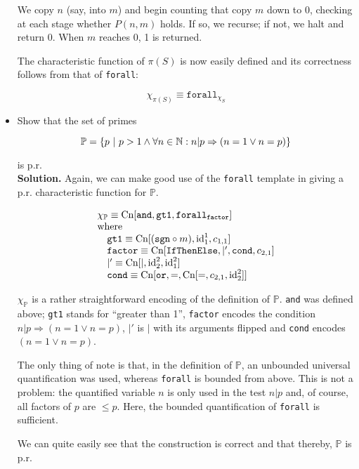 \begin{itemize}
	We copy $n$ (say, into $m$) and begin counting that copy $m$ down to 0, checking at each stage whether $P(n,m)$ holds. If so, we recurse; if not, we halt and return 0. When $m$ reaches 0, 1 is returned.
	
	The characteristic function of $\pi(S)$ is now easily defined and its correctness follows from that of \texttt{forall}:
	
	$$
		\chi_{\pi(S)} \equiv \texttt{forall}_{\chi_S}
	$$
	
	\item Show that the set of primes
	
	$$
		\mathbb{P} = \{p\ |\ p > 1 \wedge \forall n \in \mathbb{N} : n | p \Rightarrow (n = 1 \vee n = p) \}
	$$
	
	is p.r.\\
	
	\textbf{Solution.} Again, we can make good use of the \texttt{forall} template in giving a p.r. characteristic function for $\mathbb{P}$.
	
	$$
		\begin{array}{l}
			\chi_{\mathbb{P}} \equiv \textnormal{Cn}[\texttt{and}, \texttt{gt1}, \texttt{forall}_{\texttt{factor}}]\\
			\textnormal{where}\\
			\quad \texttt{gt1} \equiv \textnormal{Cn}[(\texttt{sgn} \circ m), \textnormal{id}^1_1, c_{1,1}]\\
			\quad \texttt{factor} \equiv \textnormal{Cn}[\texttt{IfThenElse}, |', \texttt{cond}, c_{2,1}]\\
			\quad |' \equiv \textnormal{Cn}[|, \textnormal{id}^2_2, \textnormal{id}^2_1]\\
			\quad \texttt{cond} \equiv \textnormal{Cn}[\texttt{or}, =, \textnormal{Cn}[=, c_{2,1}, \textnormal{id}^2_2]]
		\end{array}
	$$
	
	$\chi_\mathbb{P}$ is a rather straightforward encoding of the definition of $\mathbb{P}$. \texttt{and} was defined above; \texttt{gt1} stands for ``greater than 1'', \texttt{factor} encodes the condition $n | p \Rightarrow (n = 1 \vee n = p)$, $|'$ is $|$ with its arguments flipped and \texttt{cond} encodes $(n = 1 \vee n = p)$.
	
	The only thing of note is that, in the definition of $\mathbb{P}$, an unbounded universal quantification was used, whereas \texttt{forall} is bounded from above. This is not a problem: the quantified variable $n$ is only used in the test $n | p$ and, of course, all factors of $p$ are $\leq p$. Here, the bounded quantification of \texttt{forall} is sufficient.
	
	We can quite easily see that the construction is correct and that thereby, $\mathbb{P}$ is p.r.
\end{itemize}

